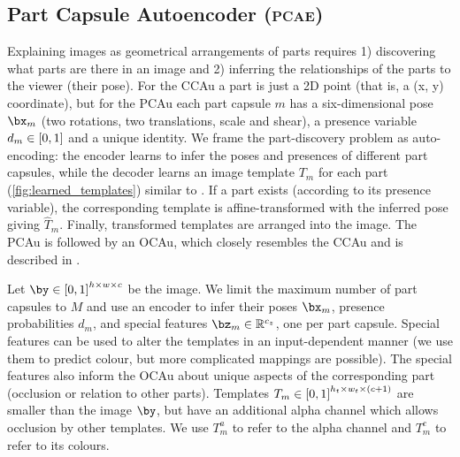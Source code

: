 \subsection{Part Capsule Autoencoder (\textsc{pcae})}
\label{sec:img_capsule}
Explaining images as geometrical arrangements of parts requires 1) discovering what parts are there in an image and 2) inferring the relationships of the parts to the viewer (their pose).
For the \gls{CCAu} a part is just a 2D point (that is, a (x, y) coordinate), but for the \gls{PCAu} each part capsule $m$ has a six-dimensional pose $\bx_m$ (two rotations, two translations, scale and shear), a presence variable $d_m \in {\left[0, 1\right]}$ and a unique identity.
We frame the part-discovery problem as auto-encoding: the encoder learns to infer the poses and presences of different part capsules, while the decoder learns an image template $T_m$ for each part (\cref{fig:learned_templates}) similar to \cite{Tieleman2014thesis,Eslami2016air}.
If a part exists (according to its presence variable), the corresponding template is affine-transformed with the inferred pose giving $\widehat{T}_m$.
Finally, transformed templates are arranged into the image.
The \gls{PCAu} is followed by an \gls{OCAu}, which closely resembles the \gls{CCAu} and is described in .

Let $\by \in \interval{0, 1}^{h \times w \times c}$ be the image.
We limit the maximum number of part capsules to $M$ and use an encoder to infer their poses $\bx_m$, presence probabilities $d_m$, and special features $\bz_m \in \RR^{c_z}$, one per part capsule.
Special features can be used to alter the templates in an input-dependent manner (we use them to predict colour, but more complicated mappings are possible). The special features also inform the \gls{OCAu} about unique aspects of the corresponding part (\!\eg occlusion or relation to other parts).
Templates $T_m \in {\left[0, 1\right]}^{h_t \times w_t \times (c+1)}$ are smaller than the image $\by$, but have an additional alpha channel which allows occlusion by other templates. 
We use $T_m^a$ to refer to the alpha channel and $T_m^c$ to refer to its colours.

